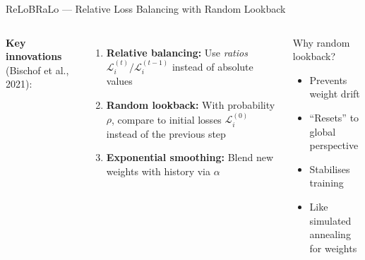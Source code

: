 \documentclass[aspectratio=169,11pt]{beamer}
\newcommand{\emphc}[1]{\textcolor{harvardcrimson}{#1}}
\begin{document}
\begin{frame}{ReLoBRaLo --- Relative Loss Balancing with Random Lookback}
\begin{columns}[T]
\textbf{Key innovations} (Bischof et al., 2021):

\vspace{0.2cm}
\begin{enumerate}
    \item \textbf{Relative balancing:} Use \emph{ratios} $\mathcal{L}_i^{(t)} / \mathcal{L}_i^{(t-1)}$ instead of absolute values

    \vspace{0.2cm}
    \item \textbf{Random lookback:} With probability $\rho$, compare to \emphc{initial losses} $\mathcal{L}_i^{(0)}$ instead of the previous step

    \vspace{0.2cm}
    \item \textbf{Exponential smoothing:} Blend new weights with history via $\alpha$
\end{enumerate}

\begin{block}{Why random lookback?}
\begin{itemize}
    \item Prevents weight drift
    \item ``Resets'' to global perspective
    \item Stabilises training
    \item Like simulated annealing for weights
\end{itemize}
\end{block}
\end{columns}
\end{frame}
\end{document}
